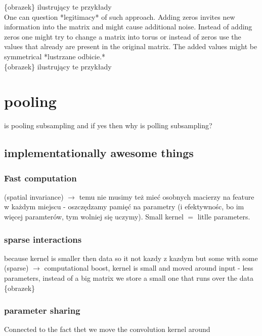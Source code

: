 \documentclass[a4paper,10pt]{report}
\begin{document}
      \{obrazek\} ilustrujący te przykłady \\
	  
      One can question *legitimacy* of such approach. Adding zeros invites new information into the matrix and might cause additional noise. Instead of adding zeros one might try to change a matrix into torus or instead of zeros use the values that already are present in the original matrix. The added values might be symmetrical *lustrzane odbicie.*\\
	  
      \{obrazek\} ilustrujący te przykłady 
      
    \section{pooling}	  
      is pooling subsampling and if yes then why is polling subsampling?\\
      
      \subsection{implementationally awesome things} %
      
	\subsubsection{Fast computation}
	  (spatial invariance) $\rightarrow$ temu nie musimy też mieć osobnych macierzy na feature w każdym miejscu - oszczędzamy pamięć na parametry (i efektywnośc, bo im więcej paramterów, tym wolniej się uczymy). Small kernel $=$ litlle parameters.\\
	
	\subsubsection{sparse interactions} %
	  because kernel is smaller then data so it not kazdy z kazdym but some with some (sparse) $\rightarrow$ computational boost, kernel is small and moved around input - less parameters, instead of a big matrix we store a small one that runs over the data\\
	  
	  \{obrazek\} %
	  
	\subsubsection{parameter sharing} %
	  Connected to the fact thet we move the convolution kernel around \\
	  
\end{document}

